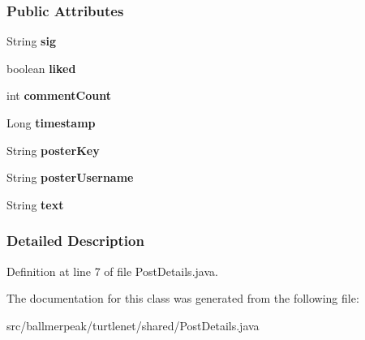 \subsubsection*{Public Attributes}
\begin{DoxyCompactItemize}
\item 
\hypertarget{classballmerpeak_1_1turtlenet_1_1shared_1_1PostDetails_ac6f606b33cca7c5be0e3eb908241bf8e}{String {\bfseries sig}}\label{classballmerpeak_1_1turtlenet_1_1shared_1_1PostDetails_ac6f606b33cca7c5be0e3eb908241bf8e}

\item 
\hypertarget{classballmerpeak_1_1turtlenet_1_1shared_1_1PostDetails_aea0cbf8b30b582800479e28eeb1e931f}{boolean {\bfseries liked}}\label{classballmerpeak_1_1turtlenet_1_1shared_1_1PostDetails_aea0cbf8b30b582800479e28eeb1e931f}

\item 
\hypertarget{classballmerpeak_1_1turtlenet_1_1shared_1_1PostDetails_a24553cdb518e4501cbdf63263c21d1a0}{int {\bfseries comment\-Count}}\label{classballmerpeak_1_1turtlenet_1_1shared_1_1PostDetails_a24553cdb518e4501cbdf63263c21d1a0}

\item 
\hypertarget{classballmerpeak_1_1turtlenet_1_1shared_1_1PostDetails_a0602043b91650f4eec3d4b71175b7362}{Long {\bfseries timestamp}}\label{classballmerpeak_1_1turtlenet_1_1shared_1_1PostDetails_a0602043b91650f4eec3d4b71175b7362}

\item 
\hypertarget{classballmerpeak_1_1turtlenet_1_1shared_1_1PostDetails_a01a466200c299cca8b1cefabb10973d7}{String {\bfseries poster\-Key}}\label{classballmerpeak_1_1turtlenet_1_1shared_1_1PostDetails_a01a466200c299cca8b1cefabb10973d7}

\item 
\hypertarget{classballmerpeak_1_1turtlenet_1_1shared_1_1PostDetails_a15dfe34395623678a63f569dc9339cbd}{String {\bfseries poster\-Username}}\label{classballmerpeak_1_1turtlenet_1_1shared_1_1PostDetails_a15dfe34395623678a63f569dc9339cbd}

\item 
\hypertarget{classballmerpeak_1_1turtlenet_1_1shared_1_1PostDetails_a28dbe8ca59c66a80b1d0538f5485314d}{String {\bfseries text}}\label{classballmerpeak_1_1turtlenet_1_1shared_1_1PostDetails_a28dbe8ca59c66a80b1d0538f5485314d}

\end{DoxyCompactItemize}


\subsubsection{Detailed Description}


Definition at line 7 of file Post\-Details.\-java.



The documentation for this class was generated from the following file\-:\begin{DoxyCompactItemize}
\item 
src/ballmerpeak/turtlenet/shared/Post\-Details.\-java\end{DoxyCompactItemize}
